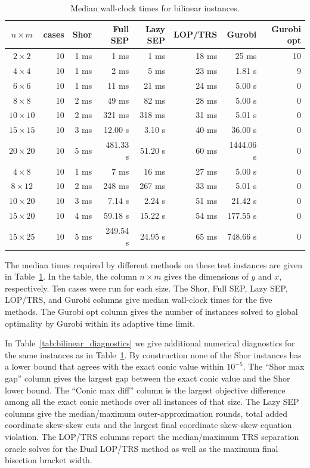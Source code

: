 \documentclass[11pt]{article}
\begin{document}
\begin{table}[htbp]
\centering
\caption{Median wall-clock times for bilinear instances.}
\label{tab:bilinear_times}
\small
\begin{tabular}{c r r r r r r r}
\hline
$n\times m$ & cases & Shor & Full SEP & Lazy SEP & LOP/TRS & Gurobi & Gurobi opt \\
\hline
$2\times 2$ & 10 & 1 ms & 1 ms & 1 ms & 18 ms & 25 ms & 10 \\
$4\times 4$ & 10 & 1 ms & 2 ms & 5 ms & 23 ms & 1.81 s & 9 \\
$6\times 6$ & 10 & 1 ms & 11 ms & 21 ms & 24 ms & 5.00 s & 0 \\
$8\times 8$ & 10 & 2 ms & 49 ms & 82 ms & 28 ms & 5.00 s & 0 \\
$10\times 10$ & 10 & 2 ms & 321 ms & 318 ms & 31 ms & 5.01 s & 0 \\
$15\times 15$ & 10 & 3 ms & 12.00 s & 3.10 s & 40 ms & 36.00 s & 0 \\
$20\times 20$ & 10 & 5 ms & 481.33 s & 51.20 s & 60 ms & 1444.06 s & 0 \\
\hline
$4\times 8$ & 10 & 1 ms & 7 ms & 16 ms & 27 ms & 5.00 s & 0 \\
$8\times 12$ & 10 & 2 ms & 248 ms & 267 ms & 33 ms & 5.01 s & 0 \\
$10\times 20$ & 10 & 3 ms & 7.14 s & 2.24 s & 51 ms & 21.42 s & 0 \\
$15\times 20$ & 10 & 4 ms & 59.18 s & 15.22 s & 54 ms & 177.55 s & 0 \\
$15\times 25$ & 10 & 5 ms & 249.54 s & 24.95 s & 65 ms & 748.66 s & 0 \\
\hline
\hline
\end{tabular}
\end{table}

The median times required by different methods on these test instances are
given in Table~\ref{tab:bilinear_times}.  In the table, the column
\(n\times m\) gives the dimensions of \(y\) and \(x\), respectively.  Ten
cases were run for each size.  The Shor, Full SEP, Lazy SEP, LOP/TRS, and
Gurobi columns give median wall-clock times for the five methods.  The
Gurobi opt column gives the number of instances solved to global optimality
by Gurobi within its adaptive time limit.

In Table~\ref{tab:bilinear_diagnostics} we give additional numerical
diagnostics for the same instances as in Table~\ref{tab:bilinear_times}.  By
construction none of the Shor instances has a lower bound that agrees with
the exact conic value within \(10^{-5}\).  The ``Shor max
gap'' column gives the largest gap between the exact conic value and
the Shor lower bound.  The ``Conic max diff'' column is the largest
objective difference
among all the exact conic methods over all instances of that size.  The Lazy
SEP columns give the median/maximum outer-approximation rounds, total added
coordinate skew-skew cuts and the largest final coordinate skew-skew equation
violation.  The
LOP/TRS columns report the median/maximum TRS separation oracle solves for
the Dual LOP/TRS method as well as the maximum final bisection
bracket width.
\end{document}
